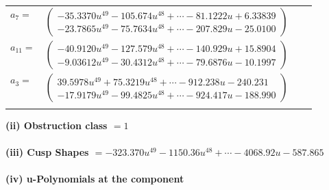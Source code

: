 \documentclass[1p]{elsarticle_modified}
\theoremstyle{definition}
\begin{document}
\begin{tabular}{m{7pt} m{180pt} m{7pt} m{180pt} }
\flushright $a_{7}=$&$\begin{pmatrix}-35.3370 u^{49}-105.674 u^{48}+\cdots-81.1222 u+6.33839\\-23.7865 u^{49}-75.7634 u^{48}+\cdots-207.829 u-25.0100\end{pmatrix}$ \\
\flushright $a_{11}=$&$\begin{pmatrix}-40.9120 u^{49}-127.579 u^{48}+\cdots-140.929 u+15.8904\\-9.03612 u^{49}-30.4312 u^{48}+\cdots-79.6876 u-10.1997\end{pmatrix}$ \\
\flushright $a_{3}=$&$\begin{pmatrix}39.5978 u^{49}+75.3219 u^{48}+\cdots-912.238 u-240.231\\-17.9179 u^{49}-99.4825 u^{48}+\cdots-924.417 u-188.990\end{pmatrix}$\\&\end{tabular}
\flushleft \textbf{(ii) Obstruction class $= 1$}\\~\\
\flushleft \textbf{(iii) Cusp Shapes $= -323.370 u^{49}-1150.36 u^{48}+\cdots-4068.92 u-587.865$}\\~\\
\newpage\renewcommand{\arraystretch}{1}
\flushleft \textbf{(iv) u-Polynomials at the component}\newline \\
\end{document}
